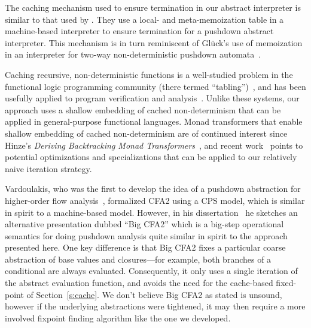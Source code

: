 The caching mechanism used to ensure termination in our abstract interpreter is
similar to that used by \citet{dvanhorn:Johnson2014Abstracting}. They use a local- and
meta-memoization table in a machine-based interpreter to ensure termination for
a pushdown abstract interpreter.  This mechanism is in turn reminiscent of
Gl\"{u}ck's use of memoization in an interpreter for two-way non-deterministic
pushdown automata~\cite{local:gluck-schmidtfest13}.

Caching recursive, non-deterministic functions is a well-studied problem in the
functional logic programming community (there termed
``tabling'')~\cite{local:tamaki1986old, local:bol1993tabulated,
  local:chen1996tabled, local:swift2012xsb}, and has been usefully applied to
program verification and analysis~\cite{local:dawson1996practical,
  local:janssens1998use}. Unlike these systems, our approach uses a shallow
embedding of cached non-determinism that can be applied in general-purpose
functional languages.
%
Monad transformers that enable shallow embedding of cached non-determinism are
of continued interest since Hinze's \emph{Deriving Backtracking Monad
  Transformers}~\cite{local:hinze2000deriving, local:kiselyov2005backtracking,
  local:fischer2011purely}, and recent work~\cite{local:ploeg2014reflection,
  local:vandenbroucke2016fixing} points to potential optimizations and
specializations that can be applied to our relatively naive iteration strategy.

Vardoulakis, who was the first to develop the idea of a pushdown abstraction
for higher-order flow analysis~\cite{dvanhorn:Vardoulakis2011CFA2}, formalized
CFA2 using a CPS model, which is similar in spirit to a machine-based model.
However, in his dissertation~\cite{local:vardoulakis-diss12} he sketches an
alternative presentation dubbed ``Big CFA2'' which is a big-step operational
semantics for doing pushdown analysis quite similar in spirit to the approach
presented here.  One key difference is that Big CFA2 fixes a particular coarse
abstraction of base values and closures---for example, both branches of a
conditional are always evaluated.  Consequently, it only uses a single
iteration of the abstract evaluation function, and avoids the need for the
cache-based fixed-point of Section~\ref{s:cache}.  We don't believe Big CFA2 as
stated is unsound, however if the underlying abstractions were tightened, it
may then require a more involved fixpoint finding algorithm like the one we
developed.

